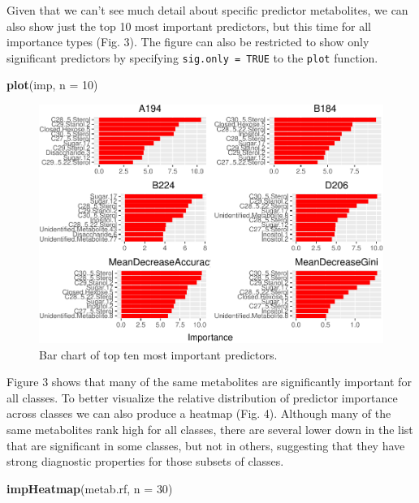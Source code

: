 \documentclass[]{article}
\newenvironment{Shaded}{\begin{snugshade}}{\end{snugshade}}
\newcommand{\KeywordTok}[1]{\textcolor[rgb]{0.13,0.29,0.53}{\textbf{{#1}}}}
\newcommand{\DataTypeTok}[1]{\textcolor[rgb]{0.13,0.29,0.53}{{#1}}}
\newcommand{\DecValTok}[1]{\textcolor[rgb]{0.00,0.00,0.81}{{#1}}}
\newcommand{\NormalTok}[1]{{#1}}
\begin{document}
Given that we can't see much detail about specific predictor
metabolites, we can also show just the top 10 most important predictors,
but this time for all importance types (Fig. 3). The figure can also be
restricted to show only significant predictors by specifying
\texttt{sig.only\ =\ TRUE} to the \texttt{plot} function.

\begin{Shaded}
\begin{Highlighting}[]
\KeywordTok{plot}\NormalTok{(imp, }\DataTypeTok{n =} \DecValTok{10}\NormalTok{)}
\end{Highlighting}
\end{Shaded}

\begin{figure}[htbp]
\centering
\includegraphics{rfPermute_ms_files/figure-latex/plot_imp2-1.pdf}
\caption{Bar chart of top ten most important predictors.}
\end{figure}

Figure 3 shows that many of the same metabolites are significantly
important for all classes. To better visualize the relative distribution
of predictor importance across classes we can also produce a heatmap
(Fig. 4). Although many of the same metabolites rank high for all
classes, there are several lower down in the list that are significant
in some classes, but not in others, suggesting that they have strong
diagnostic properties for those subsets of classes.

\begin{Shaded}
\begin{Highlighting}[]
\KeywordTok{impHeatmap}\NormalTok{(metab.rf, }\DataTypeTok{n =} \DecValTok{30}\NormalTok{)}
\end{Highlighting}
\end{Shaded}
\end{document}
